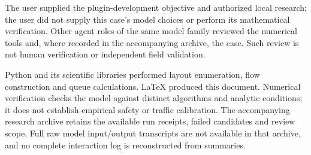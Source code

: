 \documentclass[12pt,letterpaper]{article}
\begin{document}
The user supplied the plugin-development objective and authorized local research; the user did not supply this case's model choices or perform its mathematical verification. Other agent roles of the same model family reviewed the numerical tools and, where recorded in the accompanying archive, the case. Such review is not human verification or independent field validation.

Python and its scientific libraries performed layout enumeration, flow construction and queue calculations. LaTeX produced this document. Numerical verification checks the model against distinct algorithms and analytic conditions; it does not establish empirical safety or traffic calibration. The accompanying research archive retains the available run receipts, failed candidates and review scope. Full raw model input/output transcripts are not available in that archive, and no complete interaction log is reconstructed from summaries.
\end{document}
